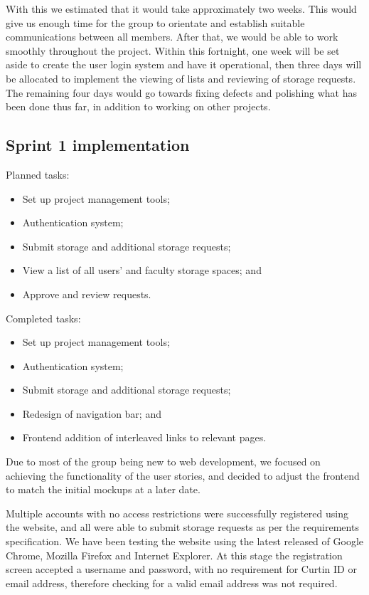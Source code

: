 \documentclass[a4paper,titlepage,12pt]{article}
\begin{document}
With this we estimated that it would take approximately two weeks. This would
give us enough time for the group to orientate and establish suitable
communications between all members. After that, we would be able to work
smoothly throughout the project. Within this fortnight, one week will be set
aside to create the user login system and have it operational, then three days
will be allocated to implement the viewing of lists and reviewing of storage
requests. The remaining four days would go towards fixing defects and polishing
what has been done thus far, in addition to working on other projects.

\subsection{Sprint 1 implementation}

Planned tasks:

\begin{itemize}
	\item Set up project management tools;
	\item Authentication system;
	\item Submit storage and additional storage requests;
	\item View a list of all users' and faculty storage spaces; and
	\item Approve and review requests.
\end{itemize}

Completed tasks:

\begin{itemize}
	\item Set up project management tools;
	\item Authentication system;
	\item Submit storage and additional storage requests;
	\item Redesign of navigation bar; and
	\item Frontend addition of interleaved links to relevant pages.
\end{itemize}

Due to most of the group being new to web development, we focused on achieving
the functionality of the user stories, and decided to adjust the frontend to
match the initial mockups at a later date.

Multiple accounts with no access restrictions were successfully registered
using the website, and all were able to submit storage requests as per the
requirements specification. We have been testing the website using the latest
released of Google Chrome, Mozilla Firefox and Internet Explorer. At this stage
the registration screen accepted a username and password, with no requirement
for Curtin ID or email address, therefore checking for a valid email address
was not required.
\end{document}
